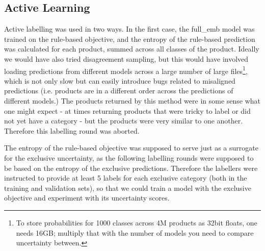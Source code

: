 \subsection{Active Learning}
\label{exp_al}

Active labelling was used in two ways.
In the first case, the full\_emb model was trained on the rule-based objective, and the entropy of the rule-based prediction was calculated for each product, summed across all classes of the product.
Ideally we would have also tried disagreement sampling, but this would have involved loading predictions from different models across a large number of large files\footnote{To store probabilities for 1000 classes across 4M products as 32bit floats, one needs 16GB; multiply that with the number of models you need to compare uncertainty between.}, which is not only slow but can easily introduce bugs related to misaligned predictions (i.e. products are in a different order across the predictions of different models.)
The products returned by this method were in some sense what one might expect - at times returning products that were tricky to label or did not yet have a category - but the products were very similar to one another. Therefore this labelling round was aborted.

The entropy of the rule-based objective was supposed to serve just as a surrogate for the exclusive uncertainty, as the following labelling rounds were supposed to be based on the entropy of the exclusive predictions.
Therefore the labellers were instructed to provide at least 5 labels for each exclusive category (both in the training and validation sets), so that we could train a model with the exclusive objective and experiment with its uncertainty scores.

